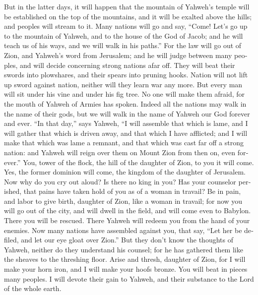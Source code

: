 \begin{paracol}{2}
\begin{otherlanguage}{english}
 But in the latter days, it will happen that the mountain
of Yahweh's temple will be established on the top of the mountains, and
it will be exalted above the hills; and peoples will stream to it.
 Many nations will go and say, ``Come! Let's go up to the
mountain of Yahweh, and to the house of the God of Jacob; and he will
teach us of his ways, and we will walk in his paths.'' For the law will
go out of Zion, and Yahweh's word from Jerusalem;  and he
will judge between many peoples, and will decide concerning strong
nations afar off. They will beat their swords into plowshares, and their
spears into pruning hooks. Nation will not lift up sword against nation,
neither will they learn war any more.  But every man will
sit under his vine and under his fig tree. No one will make them afraid,
for the mouth of Yahweh of Armies has spoken.  Indeed all
the nations may walk in the name of their gods, but we will walk in the
name of Yahweh our God forever and ever.  ``In that day,''
says Yahweh, ``I will assemble that which is lame, and I will gather
that which is driven away, and that which I have afflicted;
 and I will make that which was lame a remnant, and that
which was cast far off a strong nation: and Yahweh will reign over them
on Mount Zion from then on, even forever.''  You, tower of
the flock, the hill of the daughter of Zion, to you it will come. Yes,
the former dominion will come, the kingdom of the daughter of Jerusalem.
 Now why do you cry out aloud? Is there no king in you?
Has your counselor perished, that pains have taken hold of you as of a
woman in travail?  Be in pain, and labor to give birth,
daughter of Zion, like a woman in travail; for now you will go out of
the city, and will dwell in the field, and will come even to Babylon.
There you will be rescued. There Yahweh will redeem you from the hand of
your enemies.  Now many nations have assembled against
you, that say, ``Let her be defiled, and let our eye gloat over Zion.''
 But they don't know the thoughts of Yahweh, neither do
they understand his counsel; for he has gathered them like the sheaves
to the threshing floor.  Arise and thresh, daughter of
Zion, for I will make your horn iron, and I will make your hoofs bronze.
You will beat in pieces many peoples. I will devote their gain to
Yahweh, and their substance to the Lord of the whole earth.

\end{otherlanguage}


\end{paracol}
